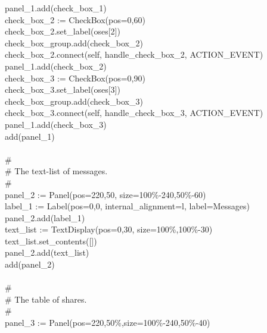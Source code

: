 {\>   \ \ \ panel\_1.add(check\_box\_1) \\
\>   \ \ \ check\_box\_2 :=
CheckBox({\textquotedbl}pos=0,60{\textquotedbl}) \\
\>   \ \ \ check\_box\_2.set\_label(oses[2]) \\
\>   \ \ \ check\_box\_group.add(check\_box\_2) \\
\>   \ \ \ check\_box\_2.connect(self,
{\textquotedbl}handle\_check\_box\_2{\textquotedbl}, ACTION\_EVENT) \\
\>   \ \ \ panel\_1.add(check\_box\_2) \\
\>   \ \ \ check\_box\_3 :=
CheckBox({\textquotedbl}pos=0,90{\textquotedbl}) \\
\>   \ \ \ check\_box\_3.set\_label(oses[3]) \\
\>   \ \ \ check\_box\_group.add(check\_box\_3) \\
\>   \ \ \ check\_box\_3.connect(self,
{\textquotedbl}handle\_check\_box\_3{\textquotedbl}, ACTION\_EVENT) \\
\>   \ \ \ panel\_1.add(check\_box\_3) \\
\>   \ \ \ add(panel\_1) \\
\ \\
\>   \ \ \ \# \\
\>   \ \ \ \# The text-list of messages. \\
\>   \ \ \ \# \\
\>   \ \ \ panel\_2 := Panel({\textquotedbl}pos=220,50{\textquotedbl},
{\textquotedbl}size=100\%-240,50\%-60{\textquotedbl}) \\
\>   \ \ \ label\_1 := Label({\textquotedbl}pos=0,0{\textquotedbl},
{\textquotedbl}internal\_alignment=l{\textquotedbl},
{\textquotedbl}label=Messages{\textquotedbl}) \\
\>   \ \ \ panel\_2.add(label\_1) \\
\>   \ \ \ text\_list :=
TextDisplay({\textquotedbl}pos=0,30{\textquotedbl},
{\textquotedbl}size=100\%,100\%-30{\textquotedbl}) \\
\>   \ \ \ text\_list.set\_contents([]) \\
\>   \ \ \ panel\_2.add(text\_list) \\
\>   \ \ \ add(panel\_2) \\
\ \\
\>   \ \ \ \# \\
\>   \ \ \ \# The table of shares. \\
\>   \ \ \ \# \\
\>   \ \ \ panel\_3 :=
Panel({\textquotedbl}pos=220,50\%{\textquotedbl},{\textquotedbl}size=100\%-240,50\%-40{\textquotedbl}) \\
}
